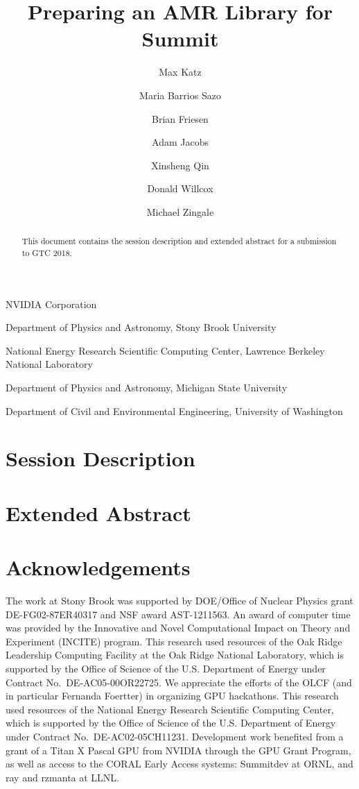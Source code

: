 \documentclass[numberedappendix]{aastex6}
\begin{document}
\title{Preparing an AMR Library for Summit}

\author{Max Katz}
\author{Maria Barrios Sazo}
\author{Brian Friesen}
\author{Adam Jacobs}
\author{Xinsheng Qin}
\author{Donald Willcox}
\author{Michael Zingale}

{
  NVIDIA Corporation
}

{
  Department of Physics and Astronomy, Stony Brook University
}

{
  National Energy Research Scientific Computing Center, Lawrence Berkeley National Laboratory
}

{
  Department of Physics and Astronomy, Michigan State University
}

{
  Department of Civil and Environmental Engineering, University of Washington
}

\begin{abstract}
  This document contains the session description and extended abstract for
  a submission to GTC 2018.
\end{abstract}

\section{Session Description}

\section{Extended Abstract}


\cite{castro}

\section{Acknowledgements}

The work at Stony Brook was supported by DOE/Office of Nuclear
Physics grant DE-FG02-87ER40317 and NSF award AST-1211563.  An award
of computer time was provided by the Innovative and Novel
Computational Impact on Theory and Experiment (INCITE) program.  This
research used resources of the Oak Ridge Leadership Computing Facility
at the Oak Ridge National Laboratory, which is supported by the Office
of Science of the U.S. Department of Energy under Contract
No.\ DE-AC05-00OR22725.  We appreciate the efforts of the OLCF (and in
particular Fernanda Foertter) in organizing GPU hackathons.  This
research used resources of the National Energy Research Scientific
Computing Center, which is supported by the Office of Science of the
U.S. Department of Energy under Contract No.\ DE-AC02-05CH11231.
Development work benefited from a grant of a Titan X Pascal GPU
from NVIDIA through the GPU Grant Program, as well as access to
the CORAL Early Access systems: Summitdev at ORNL, and ray and rzmanta
at LLNL.



\end{document}

